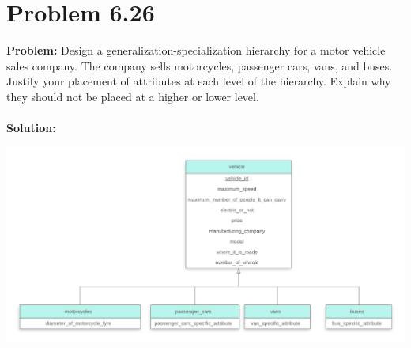 \documentclass[12pt,a4paper]{article}
\begin{document}
\section*{Problem 6.26}

\textbf{Problem:} Design a generalization-specialization hierarchy for a motor vehicle sales company. The company sells motorcycles, passenger cars, vans, and buses. Justify your placement of attributes at each level of the hierarchy. Explain why they should not be placed at a higher or lower level.
\\ \\
\textbf{Solution:}

\begin{center}
\includegraphics[width=1.1\textwidth]{solution_for_6.26.png}
\end{center}
\end{document}
